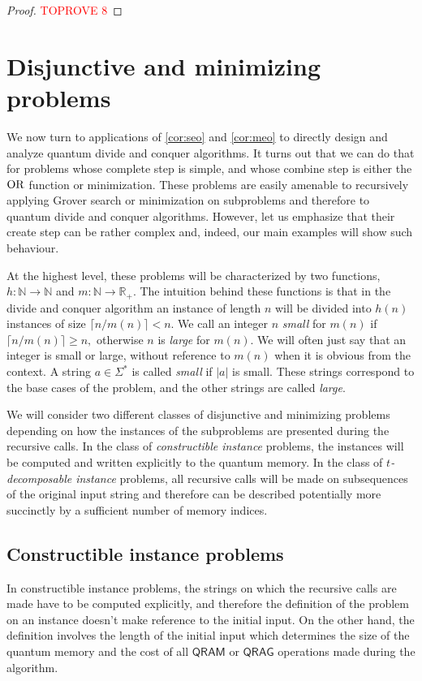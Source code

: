 \documentclass[12pt]{article}
\newcommand{\N}{\mathbb{N}}
\newcommand{\R}{\mathbb{R}}
\theoremstyle{definition}
\begin{document}
\begin{proof}\textcolor{red}{TOPROVE 8}\end{proof}



\section{Disjunctive and minimizing problems}
\label{sec:disj}
We now turn to applications of \cref{cor:seo} and \cref{cor:meo} to directly design and analyze quantum divide and conquer algorithms. 
It turns out that we can do that for problems whose complete step is simple, and whose combine step is either the ${\rm OR}$ function or minimization. 
These problems are easily amenable to recursively applying Grover search or minimization on subproblems and therefore to quantum divide and conquer algorithms. However, let us emphasize that their create step can be rather complex and, indeed, our main examples will show such behaviour.

At the highest level, these problems will be characterized by two functions, $h: \N \rightarrow \N$ and $m:\N\rightarrow\R_+$.
The intuition behind these functions is that in the divide and conquer algorithm an instance of length $n$ will be divided into $h(n)$ instances of size $\lceil n/m(n) \rceil < n$. We call an integer $n$ {\em small}
for $m(n)$ if $\lceil n/m(n) \rceil \geq n,$ otherwise $n$ is {\em large} for $m(n)$. We will often just say that an integer is small or large, without reference to $m(n)$ when it is obvious from the context.
A string $a \in \Sigma^*$ is called {\em small} if $|a|$ is small.  These strings correspond to the base cases of the problem, and the other strings are called {\em large}.

We will consider two different classes of disjunctive and minimizing problems depending on how the instances of the subproblems are presented during the recursive calls. In the class of {\em constructible instance} problems, the instances will be computed and written explicitly to the quantum memory. In the class of {\em $t$-decomposable instance} problems, all recursive calls will be made on subsequences of the original input string and therefore can be described potentially more succinctly by a sufficient number of memory indices.

\subsection{Constructible instance problems} 
\label{subsec:explicit}
In constructible instance problems, the strings on which the recursive calls are made have to be computed explicitly, and therefore the definition of the problem on an instance doesn't make reference to the initial input. On the other hand, the definition involves the length of the initial input which determines the size of the quantum memory and the cost of all $\mathsf{QRAM}$ or $\mathsf{QRAG}$ operations made during the algorithm.
\end{document}
